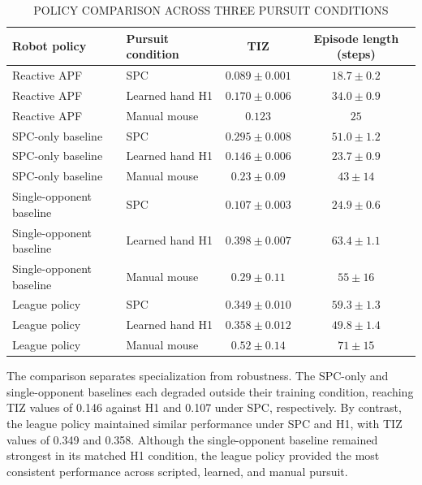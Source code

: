 \documentclass[journal,twoside,web]{ieeecolor2}
\begin{document}
\begin{table}[!t]
\caption{POLICY COMPARISON ACROSS THREE PURSUIT CONDITIONS}
\label{tab:policy-comparison}
\centering
\footnotesize
\setlength{\tabcolsep}{5pt}
\renewcommand{\arraystretch}{1.08}
\begin{tabularx}{\textwidth}{@{}>{\raggedright\arraybackslash}X >{\raggedright\arraybackslash}X c c@{}}
\toprule
Robot policy & Pursuit condition & TIZ & Episode length (steps) \\
\midrule
Reactive APF & SPC & $0.089 \pm 0.001$ & $18.7 \pm 0.2$ \\
Reactive APF & Learned hand H1 & $0.170 \pm 0.006$ & $34.0 \pm 0.9$ \\
Reactive APF & Manual mouse & $0.123$ & $25$ \\
SPC-only baseline & SPC & $0.295 \pm 0.008$ & $51.0 \pm 1.2$ \\
SPC-only baseline & Learned hand H1 & $0.146 \pm 0.006$ & $23.7 \pm 0.9$ \\
SPC-only baseline & Manual mouse & $0.23 \pm 0.09$ & $43 \pm 14$ \\
Single-opponent baseline & SPC & $0.107 \pm 0.003$ & $24.9 \pm 0.6$ \\
Single-opponent baseline & Learned hand H1 & $0.398 \pm 0.007$ & $63.4 \pm 1.1$ \\
Single-opponent baseline & Manual mouse & $0.29 \pm 0.11$ & $55 \pm 16$ \\
League policy & SPC & $0.349 \pm 0.010$ & $59.3 \pm 1.3$ \\
League policy & Learned hand H1 & $0.358 \pm 0.012$ & $49.8 \pm 1.4$ \\
League policy & Manual mouse & $0.52 \pm 0.14$ & $71 \pm 15$ \\
\bottomrule
\end{tabularx}
\end{table}

The comparison separates specialization from robustness. The SPC-only and single-opponent baselines each degraded outside their training condition, reaching TIZ values of 0.146 against H1 and 0.107 under SPC, respectively. By contrast, the league policy maintained similar performance under SPC and H1, with TIZ values of 0.349 and 0.358. Although the single-opponent baseline remained strongest in its matched H1 condition, the league policy provided the most consistent performance across scripted, learned, and manual pursuit.
\end{document}
